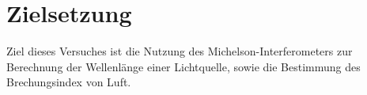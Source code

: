 \section{Zielsetzung}
\label{sec:Zielsetzung}


Ziel dieses Versuches ist die Nutzung des Michelson-Interferometers zur Berechnung der Wellenlänge einer Lichtquelle, sowie die Bestimmung des Brechungsindex von Luft.